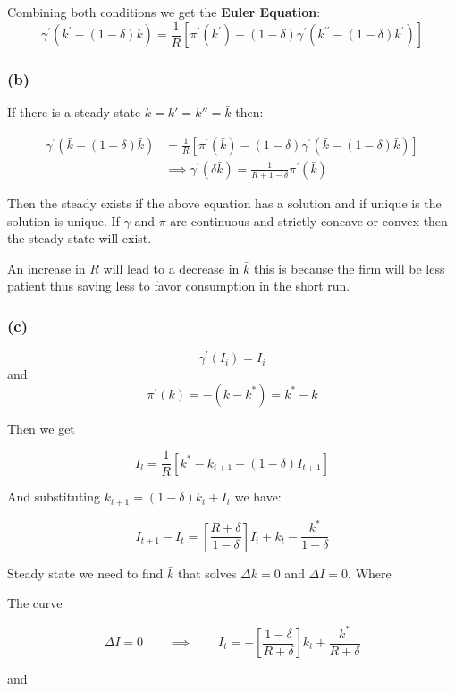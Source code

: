 \documentclass{article}
\theoremstyle{definition}
\newcommand{\qiq}{\qquad \implies \qquad}
\begin{document}
Combining both conditions we get the \textbf{Euler Equation}:
$$
\gamma^{\prime}\left(k^{\prime}-(1-\delta) k\right)=\frac{1}{R}\left[\pi^{\prime}\left(k^{\prime}\right)-(1-\delta) \gamma^{\prime}\left(k^{\prime \prime}-(1-\delta) k^{\prime}\right)\right]
$$

\subsubsection*{(b)}
If there is a steady state $k=k'=k''=\bar{k}$ then:

\begin{align*}
    \gamma^{\prime}\left(\bar{k}-(1-\delta) \bar{k}\right)&=\frac{1}{R}\left[\pi^{\prime}\left(\bar{k}\right)-(1-\delta) \gamma^{\prime}\left(\bar{k}-(1-\delta) \bar{k}\right)\right]    \\
    &\implies \gamma^{\prime}\left(\delta\bar{k}\right)=\frac{1}{R+1-\delta} \pi^{\prime}\left(\bar{k}\right)
\end{align*}

Then the steady exists if the above equation has a solution and if unique is the solution is unique. If $\gamma$ and $\pi$ are continuous and strictly concave or convex then the steady state will exist.

An increase in $R$ will lead to a decrease in $\bar{k}$ this is because the firm will be less patient thus saving less to favor consumption in the short run.

\subsubsection*{(c)}

$$\gamma^{\prime}\left(I_{i}\right)=I_{i}$$ and $$\pi^{\prime}(k)=-\left(k-k^{*}\right)=k^{*}-k$$

Then we get

$$
I_{l}=\frac{1}{R}\left[k^{*}-k_{t+1}+(1-\delta) I_{t+1}\right]
$$

And substituting $k_{t+1}=(1-\delta) k_{t}+I_{t}$ we have:

$$
I_{t+1}-I_{t}=\left[\frac{R+\delta}{1-\delta}\right] I_{i}+k_{t}-\frac{k^{*}}{1-\delta}
$$

Steady state we need to find $\bar{k}$ that solves $\Delta k=0$ and $\Delta I=0$. Where

The curve 

$$
\Delta I=0 \qiq 
I_{t}=-\left[\frac{1-\delta}{R+\delta}\right] k_{t}+\frac{k^{*}}{R+\delta}
$$

and
\end{document}
